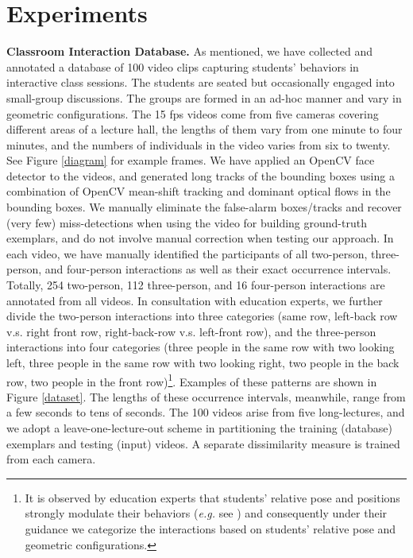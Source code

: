 \section{Experiments}
\label{expall}


\noindent\textbf{Classroom Interaction Database.} As mentioned, we have collected and annotated a database of 100 video clips capturing students' behaviors in interactive class sessions. The students are seated but occasionally engaged into small-group discussions. The groups are formed in an ad-hoc manner and vary in geometric configurations. The 15 fps videos come from five cameras covering different areas of a lecture hall, the lengths of them vary from one minute to four minutes, and the numbers of individuals in the video varies from six to twenty. See Figure \ref{diagram} for example frames. We have applied an OpenCV face detector to the videos, and generated long tracks of the bounding boxes using a combination of OpenCV mean-shift tracking and dominant optical flows in the bounding boxes. We manually eliminate the false-alarm boxes/tracks and recover (very few) miss-detections when using the video for building ground-truth exemplars, and do not involve manual correction when testing our approach. In each video, we have manually identified the participants of all two-person, three-person, and four-person interactions as well as their exact occurrence intervals. Totally, 254 two-person, 112 three-person, and 16 four-person interactions are annotated from all videos. In consultation with education experts, we further divide the two-person interactions into three categories (same row, left-back row v.s. right front row, right-back-row v.s. left-front row), and the three-person interactions into four categories (three people in the same row with two looking left, three people in the same row with two looking right, two people in the back row, two people in the front row)\footnote{It is observed by education experts that students' relative pose and positions strongly modulate their behaviors (\textit{e.g.} see \cite{Crouch:PI}) and consequently under their guidance we categorize the interactions based on students' relative pose and geometric configurations.}. Examples of these patterns are shown in Figure \ref{dataset}. The lengths of these occurrence intervals, meanwhile, range from a few seconds to tens of seconds. The 100 videos arise from five long-lectures, and we adopt a leave-one-lecture-out scheme in partitioning the training (database) exemplars and testing (input) videos. A separate dissimilarity measure is trained from each camera.


